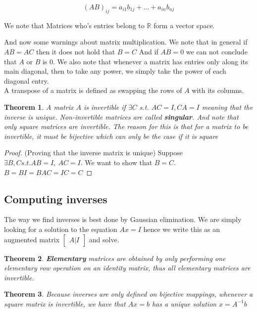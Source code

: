 \documentclass[titlepage]{article}
\newtheorem{thm}{Theorem}[subsection]
\numberwithin{equation}{subsection}
\begin{document}
$$(AB)_{ij} = a_{i1}b_{1j} + \ldots + a_{in}b_{nj}$$

\begin{remark}
We note that Matrices who's entries belong to $\mathbb{R}$ form a vector space.
\end{remark}

And now some warnings about matrix multiplication. We note that in general if $AB = AC$ then it does not hold that $B=C$ And if $AB=0$ we can not conclude that $A$ or $B$ is $0$. We also note that whenever a matrix has entries only along its main diagonal, then to take any power, we simply take the power of each diagonal entry. 
\\
A transpose of a matrix is defined as swapping the rows of $A$ with its columns. \\
\begin{thm}
A matrix $A$ is invertible if $\exists C$ s.t. $AC = I , CA=I$ meaning that the inverse is unique. Non-invertible matrices are called \textbf{singular}. And note that only square matrices are invertible. The reason for this is that for a matrix to be invertible, it must be bijective which can only be the case if it is square 
\end{thm}

\begin{proof}(Proving that the inverse matrix is unique)
Suppose $\exists B,C s.t. AB = I, \ AC=I$. We want to show that $B = C$.
\\
$B = BI = BAC = IC = C$
\end{proof}


\subsection{Computing inverses}

The way we find inverses is best done by Gaussian elimination. We are simply looking for a solution to the equation $Ax=I$ hence we write this as an augmented matrix $\begin{bmatrix}
    A | I
\end{bmatrix}$ and solve. 

\begin{thm}
\textbf{Elementary} matrices are obtained by only performing one elementary row operation on an identity matrix, thus all elementary matrices are invertible.
\end{thm}

\begin{thm}
Because inverses are only defined on bijective mappings, whenever a square matrix is invertible, we have that $Ax=b$ has a unique solution $x = A^{-1}b$
\end{thm}
\end{document}
